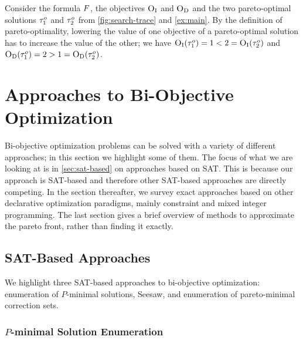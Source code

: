 \begin{example}
  Consider the formula $F$, the objectives $\textsc{O}_{\text{I}}$ and $\textsc{O}_{\text{D}}$ and the two pareto-optimal solutions $\tau^o_1$ and $\tau^o_2$ from \cref{fig:search-trace} and \cref{ex:main}.
  By the definition of pareto-optimality, lowering the value of one objective of a pareto-optimal solution has to increase the value of the other;
  we have $\textsc{O}_{\text{I}}(\tau^o_1) = 1 < 2 = \textsc{O}_{\text{I}}(\tau^o_2)$ and $\textsc{O}_{\text{D}}(\tau^o_1) = 2 > 1 = \textsc{O}_{\text{D}}(\tau^o_2)$.
\end{example}

\section{Approaches to Bi-Objective Optimization\label{sec:approaches}}

Bi-objective optimization problems can be solved with a variety of different approaches;
in this section we highlight some of them.
The focus of what we are looking at is in \cref{sec:sat-based} on approaches based on SAT.
This is because our approach is SAT-based and therefore other SAT-based approaches are directly competing.
In the section thereafter, we survey exact approaches based on other declarative optimization paradigms, mainly constraint and mixed integer programming.
The last section gives a brief overview of methods to approximate the pareto front, rather than finding it exactly.

\subsection{SAT-Based Approaches\label{sec:sat-based}}

We highlight three SAT-based approaches to bi-objective optimization:
enumeration of $P$-minimal solutions, Seesaw, and enumeration of pareto-minimal correction sets.

\subsubsection{$P$-minimal Solution Enumeration\label{sec:p-minimal}}

